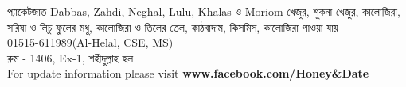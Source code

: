 \documentclass{article}
\begin{document}
\centering
{}
{{\fontsize{44}{52.8} \selectfont প্যাকেটজাত  Dabbas, Zahdi, Neghal, Lulu, Khalas  ও Moriom খেজুর, শুকনা খেজুর, কালোজিরা, সরিষা ও  লিচু ফুলের মধু, কালোজিরা ও তিলের তেল, কাঠবাদাম, কিসমিস, কালোজিরা পাওয়া যায়\\}{\fontsize{36}{43.2}\selectfont {}01515-611989(Al-Helal, CSE, MS)\\  রুম - 1406, Ex-1, শহীদুল্লাহ হল\\} {\fontsize{20}{24} \selectfont {} For update information please visit \textbf{www.facebook.com/Honey\&Date}\\}}\vspace{2cm}
\end{document}
